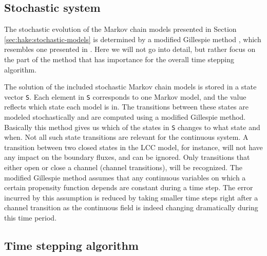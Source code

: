 \subsection{Stochastic system}

\label{sec:hake:stochastic-system}
    The stochastic evolution of the
Markov chain models presented in Section
\ref{sec:hake:stochastic-models} is determined by a modified Gillespie
method \citep{Gillespie1977}, which resembles one presented in
\citet{RudigerShuaiHuisingaEtAl2007}. Here we will not go into detail,
but rather focus on the part of the method that has importance for the
overall time stepping algorithm.

The solution of the included stochastic Markov chain models is stored
in a state vector \texttt{S}. Each element in \texttt{S} corresponds
to one Markov model, and the value reflects which state each model is
in. The transitions between these states are modeled stochastically
and are computed using a modified Gillespie method. Basically this
method gives us which of the states in \texttt{S} changes to what
state and when. Not all such state transitions are relevant for the
continuous system. A transition between two closed states in the LCC
model, for instance, will not have any impact on the boundary fluxes,
and can be ignored. Only transitions that either open or close a
channel (channel transitions), will be recognized. The modified
Gillespie method assumes that any continuous variables on which a
certain propensity function depends are constant during a time
step. The error incurred by this assumption is reduced by taking
smaller time steps right after a channel transition as the continuous
field is indeed changing dramatically during this time period.

\subsection{Time stepping algorithm}
\label{sec:hake:event-driven-simulator}

